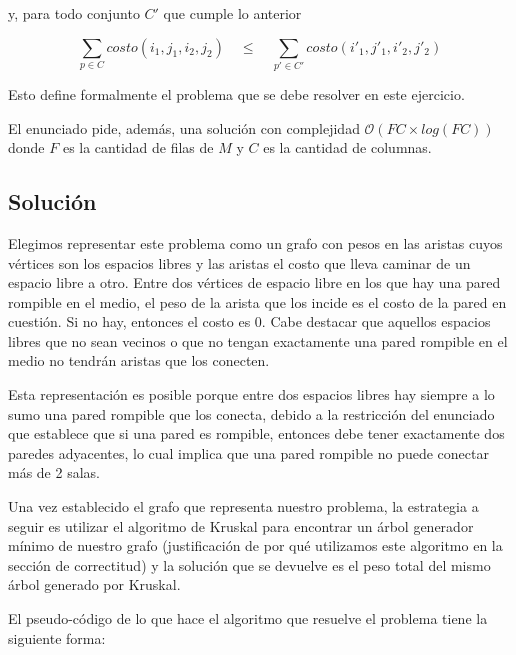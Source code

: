 y, para todo conjunto $C'$ que cumple lo anterior

$$\sum_{p \in C} costo(i_1,j_1,i_2,j_2) \quad \leq \quad \sum_{p' \in C'} costo(i'_1,j'_1,i'_2,j'_2)$$

Esto define formalmente el problema que se debe resolver en este ejercicio.

El enunciado pide, además, una solución con complejidad $\mathcal{O}(FC \times log(FC))$ donde $F$ es la cantidad de filas de $M$ y $C$ es la cantidad de columnas.

\subsection{Solución}

Elegimos representar este problema como un grafo con pesos en las aristas cuyos vértices son los espacios libres y las aristas el costo que lleva caminar de un espacio libre a otro. Entre dos vértices de espacio libre en los que hay una pared rompible en el medio, el peso de la arista que los incide es el costo de la pared en cuestión. Si no hay, entonces el costo es $0$. Cabe destacar que aquellos espacios libres que no sean vecinos o que no tengan exactamente una pared rompible en el medio no tendrán aristas que los conecten.

Esta representación es posible porque entre dos espacios libres hay siempre a lo sumo una pared rompible que los conecta, debido a la restricción del enunciado que establece que si una pared es rompible, entonces debe tener exactamente dos paredes adyacentes, lo cual implica que una pared rompible no puede conectar más de 2 salas.

Una vez establecido el grafo que representa nuestro problema, la estrategia a seguir es utilizar el algoritmo de Kruskal para encontrar un árbol generador mínimo de nuestro grafo (justificación de por qué utilizamos este algoritmo en la sección de correctitud) y la solución que se devuelve es el peso total del mismo árbol generado por Kruskal.

El pseudo-código de lo que hace el algoritmo que resuelve el problema tiene la siguiente forma:

